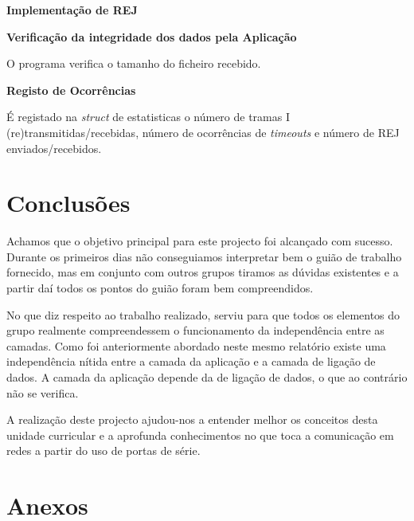 \documentclass[11pt]{article}
\begin{document}
\textbf{Implementação de REJ}
\small
{}

\normalsize

\textbf{Verificação da integridade dos dados pela Aplicação}
\par O programa verifica o tamanho do ficheiro recebido.\newline
\par\textbf{Registo de Ocorrências}
\par É registado na \textit{struct} de estatisticas o número de tramas I (re)transmitidas/recebidas, número de ocorrências de \textit{timeouts} e número de REJ enviados/recebidos.



\newpage
\section{Conclusões}
Achamos que o objetivo principal para este projecto foi alcançado com sucesso. Durante os primeiros dias não conseguiamos interpretar bem o guião de trabalho fornecido, mas em conjunto com outros grupos tiramos as dúvidas existentes e a partir daí todos os pontos do guião foram bem compreendidos. 

No que diz respeito ao trabalho realizado, serviu para que todos os elementos do grupo realmente compreendessem o funcionamento da independência entre as camadas. Como foi anteriormente abordado neste mesmo relatório existe uma independência nítida entre a camada da aplicação e a camada de ligação de dados. A camada da aplicação depende da de ligação de dados, o que ao contrário não se verifica.

A realização deste projecto ajudou-nos a entender melhor os conceitos desta unidade curricular e a aprofunda conhecimentos no que toca a comunicação em redes a partir do uso de portas de série. 



\newpage
\section{Anexos}
\small


\lstset{  title=Anexo 1 - applicationLayer.h}

\end{document}
